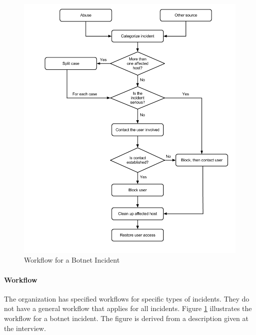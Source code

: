 \begin{figure}[H]
\hspace{-1.1cm}\includegraphics[scale=0.53]{WorkflowCaseABotnet.png}
\caption[Workflow for a Botnet Incident, Case B]{Workflow for a Botnet Incident}
\label{fig:WorkflowCaseABotnet}
\end{figure}

\paragraph{Workflow}
The organization has specified workflows for specific types of incidents. They do not have a general workflow that applies for all incidents. Figure \ref{fig:WorkflowCaseABotnet} illustrates the workflow for a botnet incident. The figure is derived from a description given at the interview. 

